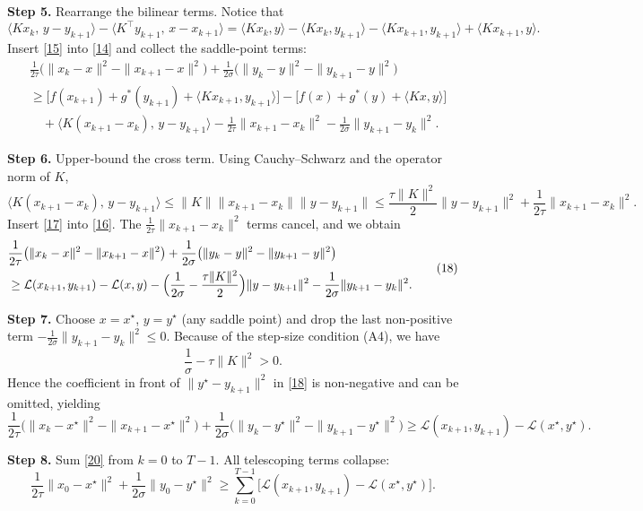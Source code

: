 \documentclass{article}
\begin{document}
\bigskip
\noindent\textbf{Step 5.}  Rearrange the bilinear terms.
Notice that
\[
\langle Kx_{k},\,y-y_{k+1}\rangle
-\langle K^{\top}y_{k+1},\,x-x_{k+1}\rangle
= \langle Kx_{k},y\rangle -\langle Kx_{k},y_{k+1}\rangle
   -\langle Kx_{k+1},y_{k+1}\rangle +\langle Kx_{k+1},y\rangle .
\tag{15}
\]
Insert \eqref{15} into \eqref{14} and collect the saddle‑point terms:
\[
\begin{aligned}
&\frac{1}{2\tau}\bigl(\|x_{k}-x\|^{2}-\|x_{k+1}-x\|^{2}\bigr)
 +\frac{1}{2\sigma}\bigl(\|y_{k}-y\|^{2}-\|y_{k+1}-y\|^{2}\bigr) \\
&\ge
\bigl[f(x_{k+1})+g^{*}(y_{k+1})+\langle Kx_{k+1},y_{k+1}\rangle\big]
-\bigl[f(x)+g^{*}(y)+\langle Kx,y\rangle\bigr] \\
&\quad
+\langle K(x_{k+1}-x_{k}),\,y-y_{k+1}\rangle
-\frac{1}{2\tau}\|x_{k+1}-x_{k}\|^{2}
-\frac{1}{2\sigma}\|y_{k+1}-y_{k}\|^{2}.
\end{aligned}
\tag{16}
\]

\bigskip
\noindent\textbf{Step 6.}  Upper‑bound the cross term.
Using Cauchy–Schwarz and the operator norm of $K$,
\[
\langle K(x_{k+1}-x_{k}),\,y-y_{k+1}\rangle
\le \|K\|\|x_{k+1}-x_{k}\|\|y-y_{k+1}\|
\le \frac{\tau\|K\|^{2}}{2}\|y-y_{k+1}\|^{2}
        +\frac{1}{2\tau}\|x_{k+1}-x_{k}\|^{2}.
\tag{17}
\]
Insert \eqref{17} into \eqref{16}. The $\frac{1}{2\tau}\|x_{k+1}-x_{k}\|^{2}$ terms cancel,
and we obtain
\[
\begin{aligned}
&\frac{1}{2\tau}\bigl(\|x_{k}-x\|^{2}-\|x_{k+1}-x\|^{2}\bigr)
 +\frac{1}{2\sigma}\bigl(\|y_{k}-y\|^{2}-\|y_{k+1}-y\|^{2}\bigr) \\
&\ge
\mathcal L(x_{k+1},y_{k+1})-\mathcal L(x,y)
-\Bigl(\frac{1}{2\sigma}-\frac{\tau\|K\|^{2}}{2}\Bigr)\|y-y_{k+1}\|^{2}
-\frac{1}{2\sigma}\|y_{k+1}-y_{k}\|^{2}.
\end{aligned}
\tag{18}
\]

\bigskip
\noindent\textbf{Step 7.}  Choose $x=x^{\star}$, $y=y^{\star}$ (any saddle point) and drop the last non‑positive term $-\frac{1}{2\sigma}\|y_{k+1}-y_{k}\|^{2}\le0$.
Because of the step‑size condition (A4), we have
\[
\frac{1}{\sigma}-\tau\|K\|^{2}>0 .
\tag{19}
\]
Hence the coefficient in front of $\|y^{\star}-y_{k+1}\|^{2}$ in \eqref{18} is non‑negative and can be omitted, yielding
\[
\frac{1}{2\tau}\bigl(\|x_{k}-x^{\star}\|^{2}-\|x_{k+1}-x^{\star}\|^{2}\bigr)
 +\frac{1}{2\sigma}\bigl(\|y_{k}-y^{\star}\|^{2}-\|y_{k+1}-y^{\star}\|^{2}\bigr)
 \ge \mathcal L(x_{k+1},y_{k+1})-\mathcal L(x^{\star},y^{\star}).
\tag{20}
\]

\bigskip
\noindent\textbf{Step 8.}  Sum \eqref{20} from $k=0$ to $T-1$.
All telescoping terms collapse:
\[
\frac{1}{2\tau}\|x_{0}-x^{\star}\|^{2}
+\frac{1}{2\sigma}\|y_{0}-y^{\star}\|^{2}
\ge \sum_{k=0}^{T-1}\bigl[\mathcal L(x_{k+1},y_{k+1})-\mathcal L(x^{\star},y^{\star})\bigr].
\tag{21}
\]
\end{document}
